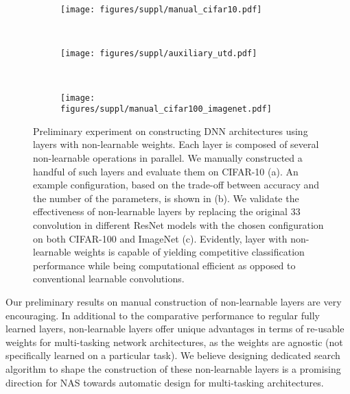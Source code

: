 \documentclass[journal]{IEEEtran}
\theoremstyle{definition}
\theoremstyle{remark}
\begin{document}
\begin{figure}[!htbp]
	\centering
	\begin{subfigure}[t]{.45\textwidth}
		\centering
        \texttt{[image: figures/suppl/manual\_cifar10.pdf]}
        \caption{}
        \label{fig:manual_cifar10}
	\end{subfigure}\\
	\begin{subfigure}[t]{.40\textwidth}
		\centering
        \texttt{[image: figures/suppl/auxiliary\_utd.pdf]}
        \caption{}
        \label{fig:auxiliary_utd}
	\end{subfigure}\\
	\begin{subfigure}[t]{.48\textwidth}
		\centering
        \texttt{[image: figures/suppl/manual\_cifar100\_imagenet.pdf]}
        \caption{}
        \label{fig:manual_cifar100_imagenet}
	\end{subfigure}
	\caption{Preliminary experiment on constructing DNN architectures using layers with non-learnable weights. Each layer is composed of several non-learnable operations in parallel. We manually constructed a handful of such layers and evaluate them on CIFAR-10 (a). An example configuration, based on the trade-off between accuracy and the number of the parameters, is shown in (b). We validate the effectiveness of non-learnable layers by replacing the original 33 convolution in different ResNet models with the chosen configuration on both CIFAR-100 and ImageNet (c). Evidently, layer with non-learnable weights is capable of yielding competitive classification performance while being computational efficient as opposed to conventional learnable convolutions.
	\label{fig:preliminary_non_learnable}\vspace{-0.3cm}}
\end{figure}

Our preliminary results on manual construction of non-learnable layers are very encouraging. In additional to the comparative performance to regular fully learned layers, non-learnable layers offer unique advantages in terms of re-usable weights for multi-tasking network architectures, as the weights are agnostic (not specifically learned on a particular task). We believe designing dedicated search algorithm to shape the construction of these non-learnable layers is a promising direction for NAS towards automatic design for multi-tasking architectures.
\end{document}
